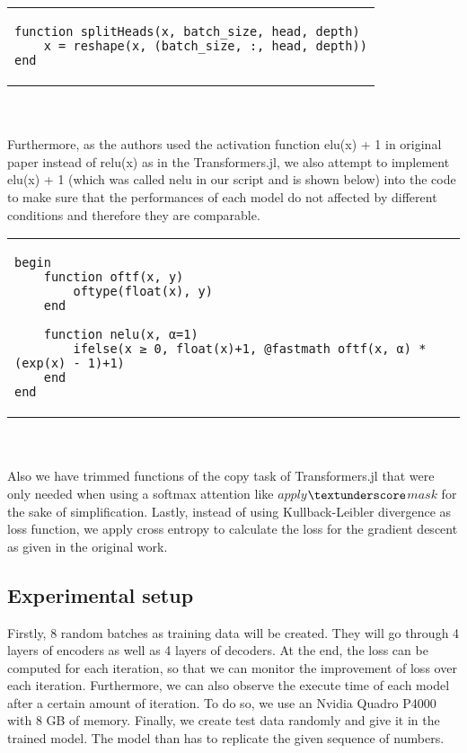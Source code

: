 \documentclass[DIV=13,fontsize=11pt]{scrartcl}
\begin{document}
\begin{tabular}{b}
\begin{verbatim}
function splitHeads(x, batch_size, head, depth)
    x = reshape(x, (batch_size, :, head, depth))
end
\end{verbatim}
\end{tabular} \\

\\ Furthermore, as the authors used the activation function elu(x) + 1 in original paper instead of relu(x) as in the Transformers.jl, we also attempt to implement elu(x) + 1 (which was called nelu in our script and is shown below) into the code to make sure that the performances of each model do not affected by different conditions and therefore they are comparable. 

\begin{tabular}{b}
\begin{verbatim}
begin
    function oftf(x, y)
        oftype(float(x), y)
    end
    
    function nelu(x, α=1)
        ifelse(x ≥ 0, float(x)+1, @fastmath oftf(x, α) * (exp(x) - 1)+1)
    end
end
\end{verbatim}
\end{tabular} \\

\\ Also we have trimmed functions of the copy task of Transformers.jl that were only needed when using a softmax attention like  \(apply\)\(\textunderscore\)\(mask\) for the sake of simplification. Lastly, instead of using Kullback-Leibler divergence as loss function, we apply cross entropy to calculate the loss for the gradient descent as given in the original work.



\subsection{Experimental setup}
Firstly, 8 random batches as training data will be created. They will go through 4 layers of encoders as well as 4 layers of decoders. At the end, the loss can be computed for each iteration, so that we can monitor the improvement of loss over each iteration. Furthermore, we can also observe the execute time of each model after a certain amount of iteration. To do so, we use an Nvidia Quadro P4000 with 8 GB of memory. Finally, we create test data randomly and give it in the trained model. The model than has to replicate the given sequence of numbers.
\end{document}
